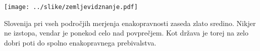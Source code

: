 \documentclass[11pt,a4paper]{article}
\begin{document}
\texttt{[image: ../slike/zemljevidznanje.pdf]}

Slovenija pri vseh področjih merjenja enakopravnosti zaseda zlato sredino. Nikjer ne izstopa, vendar je ponekod celo nad povprečjem. Kot država je torej na zelo dobri poti do spolno enakopravnega prebivalstva.




\end{document}

